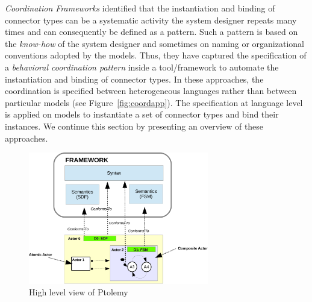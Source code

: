 \emph{Coordination Frameworks} identified that the instantiation and binding of connector types can be a systematic activity the system designer repeats many times and can consequently be defined as a pattern. Such a pattern is based on the \emph{know-how} of the system designer and sometimes on naming or organizational conventions adopted by the models. Thus, they have captured the specification of a \emph{behavioral coordination pattern} inside a tool/framework to automate the instantiation and binding of connector types. In these approaches, the coordination is specified between heterogeneous languages rather than between particular models (see Figure~\ref{fig:coordapp}). The specification at language level is applied on models to instantiate a set of connector types and bind their instances. We continue this section by presenting an overview of these approaches.
 \begin{figure}
 	\begin{center}
 		\includegraphics[width=0.7\textwidth]{background/figs/ptolemyfig}
 		\caption{High level view of Ptolemy~\cite{giraultbib}}
 		\label{fig:ptolemyfig}
 	\end{center}
 \end{figure}


